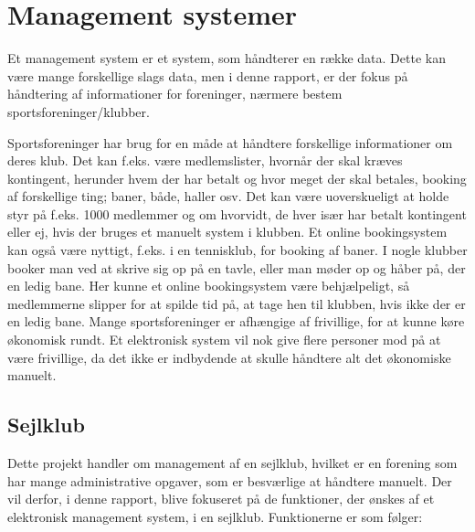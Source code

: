 \chapter{Management systemer}\label{chap:management-systemer}

\cbstart





Et management system er et system, som håndterer en række data. Dette kan være mange forskellige slags data, men i denne
rapport, er der fokus på håndtering af informationer for foreninger, nærmere bestem sportsforeninger/klubber.

Sportsforeninger har brug for en måde at håndtere forskellige informationer om deres klub. Det kan f.eks. være
medlemslister, hvornår der skal kræves kontingent, herunder hvem der har betalt og hvor meget der skal betales, booking
af forskellige ting; baner, både, haller osv. Det kan være uoverskueligt at holde styr på f.eks. 1000 medlemmer og om
hvorvidt, de hver især har betalt kontingent eller ej, hvis der bruges et manuelt system i klubben. Et online
bookingsystem kan også være nyttigt, f.eks. i en tennisklub, for booking af baner. I nogle klubber booker man ved at
skrive sig op på en tavle, eller man møder op og håber på, der en ledig bane. Her kunne et online bookingsystem være
behjælpeligt, så medlemmerne slipper for at spilde tid på, at tage hen til klubben, hvis ikke der er en ledig bane.
\newline
Mange sportsforeninger er afhængige af frivillige, for at kunne køre økonomisk rundt. Et
elektronisk system vil nok give flere personer mod på at være frivillige, da det ikke er indbydende at skulle håndtere
alt det økonomiske manuelt.

\section{Sejlklub}\label{sec:sejlklub}
Dette projekt handler om management af en sejlklub, hvilket er en forening som har mange administrative opgaver, som er
besværlige at håndtere manuelt. Der vil derfor, i denne rapport, blive fokuseret på de funktioner, der ønskes af et
elektronisk management system, i en sejlklub. Funktionerne er som følger:

